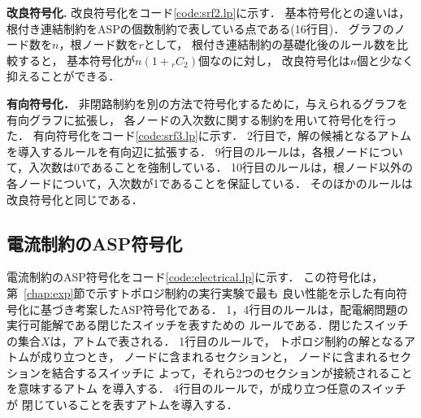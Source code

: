 \textbf{改良符号化.}
%
改良符号化をコード\ref{code:srf2.lp}に示す．
基本符号化との違いは，根付き連結制約をASPの個数制約で表している点である(16行目)．
グラフのノード数を$n$，根ノード数を$r$として，
根付き連結制約の基礎化後のルール数を比較すると，
基本符号化が$n(1+{}_{r}C_{2})$個なのに対し，
改良符号化は$n$個と少なく抑えることができる．
 
\textbf{有向符号化．}
非閉路制約を別の方法で符号化するために，与えられるグラフを有向グラフに拡張し，
各ノードの入次数に関する制約を用いて符号化を行った．
有向符号化をコード\ref{code:srf3.lp}に示す．
2行目で，解の候補となるアトムを導入するルールを有向辺に拡張する．
9行目のルールは，各根ノードについて，入次数は0であることを強制している．
10行目のルールは，根ノード以外の各ノードについて，入次数が1であることを保証している．
そのほかのルールは改良符号化と同じである．

\subsection{電流制約のASP符号化}\label{chap:electrical}



電流制約のASP符号化をコード\ref{code:electrical.lp}に示す．
この符号化は，第~\ref{chap:exp}節で示すトポロジ制約の実行実験で最も
良い性能を示した有向符号化に基づき考案したASP符号化である．
%
1，4行目のルールは，配電網問題の実行可能解である閉じたスイッチを表すための
ルールである．閉じたスイッチの集合$X$は，アトムで表される．
1行目のルールで，
トポロジ制約の解となるアトムが成り立つとき，
ノードに含まれるセクションと，
ノードに含まれるセクションを結合するスイッチに
よって，それら2つのセクションが接続されることを意味するアトム
を導入する．
4行目のルールで，が成り立つ任意のスイッチが
閉じていることを表すアトムを導入する．

